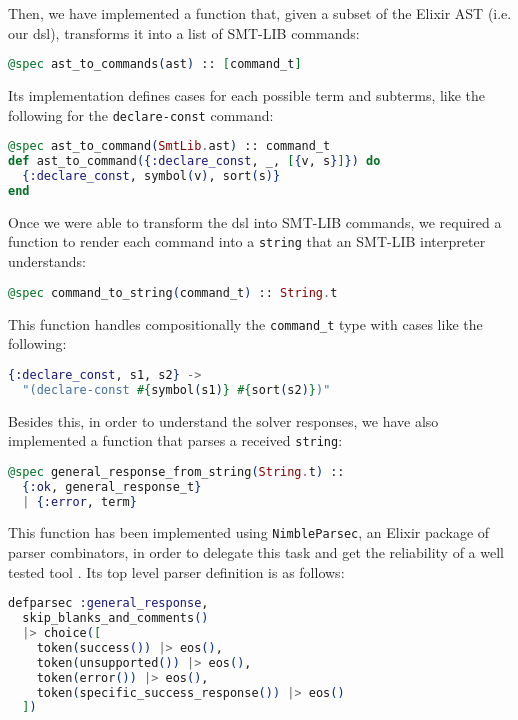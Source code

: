 Then, we have implemented a function that, given a subset of the Elixir AST
(i.e. our \gls{dsl}), transforms it into a list of SMT-LIB commands:

\begin{lstlisting}[language=elixir,numbers=none,frame=none]
@spec ast_to_commands(ast) :: [command_t]
\end{lstlisting}

Its implementation defines cases for each possible term and subterms, like the
following for the \verb|declare-const| command:

\begin{lstlisting}[language=elixir,numbers=none,frame=none]
@spec ast_to_command(SmtLib.ast) :: command_t
def ast_to_command({:declare_const, _, [{v, s}]}) do
  {:declare_const, symbol(v), sort(s)}
end
\end{lstlisting}

Once we were able to transform the \gls{dsl} into SMT-LIB commands, we required
a function to render each command into a \verb|string| that an SMT-LIB
interpreter understands:

\begin{lstlisting}[language=elixir,numbers=none,frame=none]
@spec command_to_string(command_t) :: String.t
\end{lstlisting}

This function handles compositionally the \verb|command_t| type with cases like
the following:

\begin{lstlisting}[language=elixir,numbers=none,frame=none]
{:declare_const, s1, s2} ->
  "(declare-const #{symbol(s1)} #{sort(s2)})"
\end{lstlisting}

Besides this, in order to understand the solver responses, we have also
implemented a function that parses a received \verb|string|:

\begin{lstlisting}[language=elixir,numbers=none,frame=none]
@spec general_response_from_string(String.t) :: 
  {:ok, general_response_t} 
  | {:error, term}
\end{lstlisting}

This function has been implemented using \verb|NimbleParsec|, an Elixir package
of parser combinators, in order to delegate this task and get the reliability of
a well tested tool \citep{NimbleDocs}. Its top level parser definition is as
follows:

\begin{lstlisting}[language=elixir,numbers=none,frame=none]
defparsec :general_response,
  skip_blanks_and_comments()
  |> choice([
    token(success()) |> eos(),
    token(unsupported()) |> eos(),
    token(error()) |> eos(),
    token(specific_success_response()) |> eos()
  ])
\end{lstlisting}

